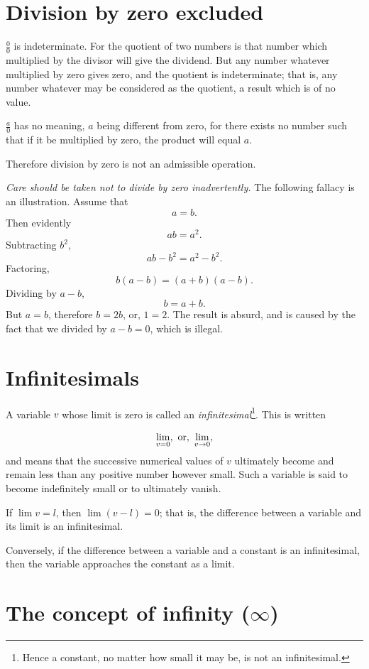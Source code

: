 \section{Division by zero excluded}
\label{sec:14}

$\frac{0}{0}$ is indeterminate. For the quotient of two numbers 
is that number which multiplied by the divisor will give 
the dividend. But any number whatever multiplied by zero 
gives zero, and the quotient is indeterminate; that is, 
any number whatever may be considered as the quotient, a 
result which is of no value.

$\frac{a}{0}$ has no meaning, $a$ being different from zero, 
for there exists no number such that if it be multiplied by zero, 
the product will equal $a$.

Therefore division by zero is not an admissible operation.

{\it Care should be taken not to divide by zero inadvertently.} The following 
fallacy is an illustration.
Assume that 
\[
	a 	= b.
\]
Then evidently 	
\[
ab = a^2.
\]
Subtracting $b^2$,
\[
 ab-b^2 	= a^2-b^2.
\]
Factoring, 	
\[
b(a-b) 	= (a + b)(a-b).
\]
Dividing by $a - b$, 	
\[
b = a + b.
\]
But 	$a 	= b$,
therefore $b 	= 2b$,
or, 	$1 	= 2$.
The result is absurd, and is caused by the fact that we divided by 
$a-b = 0$, which is illegal.

\section{Infinitesimals}
\label{sec:15}

A variable $v$ whose limit is zero is called an {\it 
infinitesimal}\footnote{Hence a constant, no matter how small 
it may be, is not an infinitesimal.}.
This is written

\[
    \lim_{v = 0}, \ {\rm or},\ \lim_{v\rightarrow 0},
\]
and means that the successive numerical values of $v$ ultimately 
become and remain less than any positive number however small. 
Such a variable is said to become indefinitely small or to ultimately vanish.

If   $\lim v = l$, then $\lim (v-l) = 0$;
that is, the difference between a variable and its limit is an infinitesimal.

Conversely, if the difference between a variable and a 
constant is an infinitesimal, then the variable approaches the 
constant as a limit.

\section{The concept of infinity ($\infty$)}


